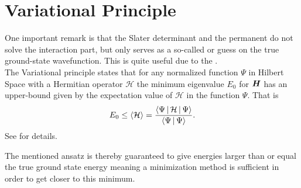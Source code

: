 \section{Variational Principle\label{sec:varPrinc}}
    One important remark is that the Slater determinant and the permanent do
    not solve the interaction part, but only serves as a so-called
     or guess on the true ground-state wavefunction. This is
    quite useful due to the . \\
    The Variational principle states that for any normalized function $\Psi$ in
    Hilbert Space \cite{GriffQuan} with a Hermitian operator $\mathcal{H}$ the
    minimum eigenvalue $E_0$ for $\boldsymbol{{H}}$ has an upper-bound given by the
    expectation value of $\mathcal{H}$ in the function $\Psi$. That is
        \begin{equation}
            E_0 \leq \left< {\mathcal{H}} \right> =
            \frac{\Braket{\Psi|\mathcal{H}|\Psi}}{\Braket{\Psi|\Psi}}. 
            \label{eq:varPrinc}
        \end{equation}
    See \cite{GriffQuan} for details.

    The mentioned ansatz is thereby guaranteed to give energies larger than or
    equal the true ground state energy meaning a minimization method is
    sufficient in order to get closer to this minimum. 
   
